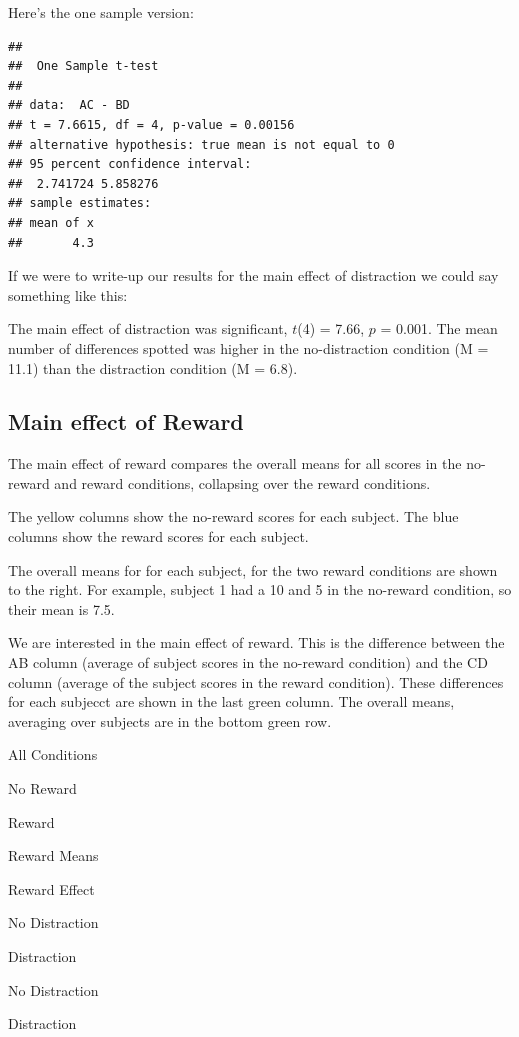 \documentclass[]{book}
\begin{document}
Here's the one sample version:

\begin{verbatim}
## 
## 	One Sample t-test
## 
## data:  AC - BD
## t = 7.6615, df = 4, p-value = 0.00156
## alternative hypothesis: true mean is not equal to 0
## 95 percent confidence interval:
##  2.741724 5.858276
## sample estimates:
## mean of x 
##       4.3
\end{verbatim}

If we were to write-up our results for the main effect of distraction we could say something like this:

The main effect of distraction was significant, \(t\)(4) = 7.66, \(p\) = 0.001. The mean number of differences spotted was higher in the no-distraction condition (M = 11.1) than the distraction condition (M = 6.8).

\hypertarget{main-effect-of-reward}{%
\subsection{Main effect of Reward}\label{main-effect-of-reward}}

The main effect of reward compares the overall means for all scores in the no-reward and reward conditions, collapsing over the reward conditions.

The yellow columns show the no-reward scores for each subject. The blue columns show the reward scores for each subject.

The overall means for for each subject, for the two reward conditions are shown to the right. For example, subject 1 had a 10 and 5 in the no-reward condition, so their mean is 7.5.

We are interested in the main effect of reward. This is the difference between the AB column (average of subject scores in the no-reward condition) and the CD column (average of the subject scores in the reward condition). These differences for each subjecct are shown in the last green column. The overall means, averaging over subjects are in the bottom green row.

All Conditions

No Reward

Reward

Reward Means

Reward Effect

No Distraction

Distraction

No Distraction

Distraction
\end{document}
